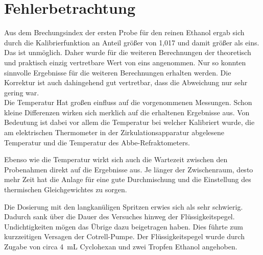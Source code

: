 \newpage
\section{Fehlerbetrachtung}
\label{sec:fehler}

Aus dem Brechungsindex der ersten Probe für den reinen Ethanol ergab sich durch die Kalibrierfunktion an Anteil größer von 1,017 und damit größer als eins. Das ist unmöglich. Daher wurde für die weiteren Berechnungen der theoretisch und praktisch einzig vertretbare Wert von eins angenommen. Nur so konnten sinnvolle Ergebnisse für die weiteren Berechnungen erhalten werden. Die Korrektur ist auch dahingehend gut vertretbar, dass die Abweichung nur sehr gering war.\\


Die Temperatur Hat großen einfluss auf die vorgenommenen Messungen. Schon kleine Differenzen wirken sich merklich auf die erhaltenen Ergebnisse aus. Von Bedeutung ist dabei vor allem die Temperatur bei welcher Kalibriert wurde, die am elektrischen Thermometer in der Zirkulationsapparatur abgelesene Temperatur und die Temperatur des Abbe-Refraktometers.

Ebenso wie die Temperatur wirkt sich auch die Wartezeit zwischen den Probenahmen direkt auf die Ergebnisse aus. Je länger der Zwischenraum, desto mehr Zeit hat die Anlage für eine gute Durchmischung und die Einstellung des thermischen Gleichgewichtes zu sorgen.

Die Dosierung mit den langkanüligen Spritzen erwies sich als sehr schwierig. Dadurch sank über die Dauer des Versuches hinweg der Flüssigkeitspegel. Undichtigkeiten mögen das Übrige dazu beigetragen haben. Dies führte zum kurzzeitigen Versagen der Cotrell-Pumpe. Der Flüssigkeitspegel wurde durch Zugabe von circa \SI{4}{\milli\liter} Cyclohexan und zwei Tropfen Ethanol angehoben. 


